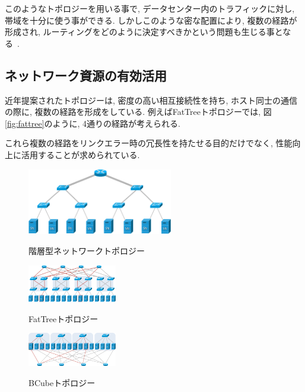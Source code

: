 \documentclass[technicalreport]{ieicej}
\begin{document}
このようなトポロジーを用いる事で, データセンター内のトラフィックに対し, 帯域を十分に使う事ができる.
しかしこのような密な配置により, 複数の経路が形成され, ルーティングをどのように決定すべきかという問題も生じる事となる~\cite{improving}.

\subsection{ネットワーク資源の有効活用}
近年提案されたトポロジーは, 密度の高い相互接続性を持ち, ホスト同士の通信の際に, 複数の経路を形成をしている.
例えばFatTreeトポロジーでは, 図\ref{fig:fattree}のように, 4通りの経路が考えられる.

これら複数の経路をリンクエラー時の冗長性を持たせる目的だけでなく, 性能向上に活用することが求められている.
\begin{figure}[h]
    \begin{center}
    \includegraphics[autoebb, width=180pt]{./img/hierarchy_topology.pdf}
    \caption{階層型ネットワークトポロジー}
    \label{fig:hierarchical}
    \end{center}
\end{figure}

\begin{figure}[h]
\begin{minipage}{0.5\hsize}
\begin{center}
\includegraphics[autoebb, width=110pt]{./img/fattree_topology.pdf}
\end{center}
\caption{FatTreeトポロジー}
\label{fig:fattree}
\end{minipage}
\begin{minipage}{0.5\hsize}
\begin{center}
\includegraphics[autoebb, width=110pt]{./img/bcube.pdf}
\end{center}
\caption{BCubeトポロジー}
\label{fig:bcube}
\end{minipage}
\end{figure}
\end{document}
